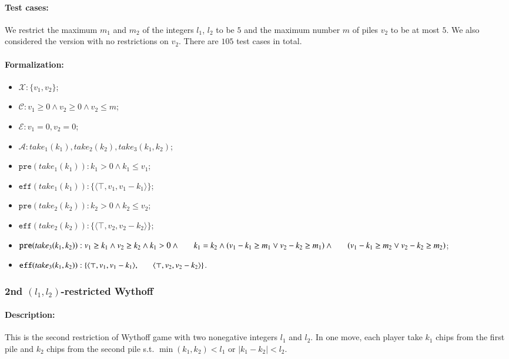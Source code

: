 \documentclass[review]{elsarticle}
\newcommand{\set}[1]{\{ #1 \}}
\newcommand{\tuple}[1]{\langle {#1} \rangle}
\newcommand{\true}{\top}
\newcommand{\statevar}{\mathcal{X}}
\newcommand{\act}{\mathcal{A}}
\newcommand{\constraint}{\mathcal{C}}
\newcommand{\estate}{\mathcal{E}}
\newcommand{\pre}{\mathtt{pre}}
\newcommand{\eff}{\mathtt{eff}}
\begin{document}
\paragraph{Test cases:}
We restrict the maximum $m_1$ and $m_2$ of the integers $l_1$, $l_2$ to be $5$ and the maximum number $m$ of piles $v_2$ to be at most $5$.
We also considered the version with no restrictions on $v_2$.
There are $105$ test cases in total.
\paragraph{Formalization:}
\begin{itemize}
	\item $\statevar: \set{v_1, v_2}$;
	\item $\constraint: v_1 \ge 0 \wedge  v_2 \ge 0 \wedge v_2 \le m$;
	\item $\estate: v_1 =0 , v_2 = 0$;
	\item $\act:take_1(k_1), take_2(k_2), take_3(k_1,k_2)$;
	\item $\pre(take_1(k_1)) :  k_1 > 0 \wedge k_1 \le v_1$;
	\item $\eff(take_1(k_1)) : \set{\tuple{\true, v_1, v_1-k_1}}$;
	\item $\pre(take_2(k_2)) :  k_2 > 0 \wedge k_2 \le v_2$;
	\item $\eff(take_2(k_2)) : \set{\tuple{\true, v_2, v_2-k_2}}$;
	\item $\pre(take_3(k_1, k_2)) : v_1 \ge k_1 \wedge v_2 \ge k_2 \wedge
	k_1 > 0 \wedge  \\ \hspace*{6mm} k_1 = k_2 \wedge (v_1 - k_1 \ge m_1 \vee v_2 - k_2 \ge m_1) \wedge \\ \hspace*{6mm}
	(v_1 - k_1 \ge m_2 \vee v_2 - k_2 \ge m_2)$;
	\item $\eff(take_3(k_1, k_2)) : \set{\tuple{\true, v_1, v_1 -k_1},\\ \hspace*{6mm}
		\tuple{\true, v_2, v_2 - k_2}}$.
\end{itemize}



\subsubsection{2nd $(l_1,l_2)$-restricted Wythoff \protect\cite{Gur2012}}

\paragraph{Description:}
This is the second restriction of Wythoff game with two nonegative integers $l_1$ and $l_2$.
In one move, each player take $k_1$ chips from the first pile and $k_2$ chips from the second pile s.t. $\min(k_1, k_2) < l_1$ or $|k_1 - k_2| < l_2$.
%
\end{document}
